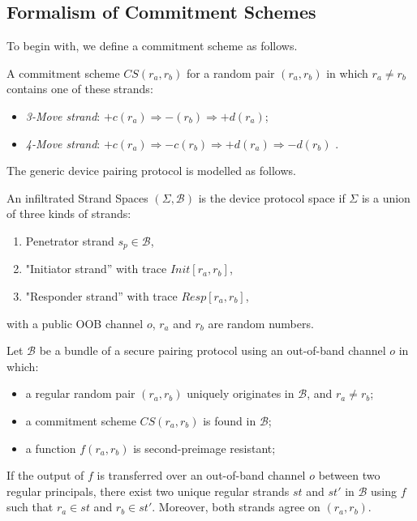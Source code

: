 \subsection{Formalism of Commitment Schemes}

To begin with, we define a commitment scheme as follows. 
 
\begin{Definition}
A commitment scheme $CS(r_a,r_b)$ for a random pair $(r_a,r_b)$ in which $r_a \not= r_b$ contains one of these strands:
\begin{itemize}
\item \emph{3-Move strand}: $+c(r_a) \Rightarrow -(r_b) \Rightarrow +d(r_a)$;
\item \emph{4-Move strand}: $+c(r_a) \Rightarrow -c(r_b) \Rightarrow+d(r_a) \Rightarrow -d(r_b) $ .
\end{itemize}
\end{Definition}

The generic device pairing protocol is modelled as follows. 

\begin{Definition}
An infiltrated Strand Spaces $(\Sigma,\mathcal{B})$ is the device protocol space if $\Sigma$ is a union of three kinds of strands:
\begin{enumerate}
\item Penetrator strand $s_p \in \mathcal{B}$,
\item "Initiator strand'' with trace {\small $Init[r_a,r_b]$},
\item "Responder strand'' with trace {\small $Resp[r_a,r_b]$},
\end{enumerate}
with a public OOB channel $o$, $r_a$ and $r_b$ are random numbers. 
\end{Definition}

\begin{Proposition}\label{provablebundle}
Let $\mathcal{B}$ be a bundle of a secure pairing protocol using an out-of-band channel $o$ in which:
\begin{itemize}
\item a regular random pair $(r_a,r_b)$ uniquely originates in $\mathcal{B}$, and $r_a \not= r_b$;
\item a commitment scheme $CS(r_a,r_b)$ is found in $\mathcal{B}$;
\item a function $f(r_a,r_b)$ is second-preimage resistant;
\end{itemize}
If the output of $f$ is transferred over an out-of-band channel $o$ between two regular principals, there exist two unique regular strands $st$ and $st'$ in $\mathcal{B}$ using $f$ such that $r_a \in st$ and $r_b \in st'$. Moreover, both strands agree on $(r_a,r_b)$. 
\end{Proposition}


